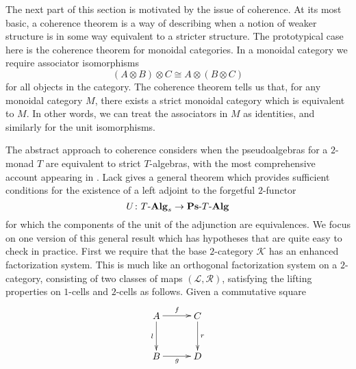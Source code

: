 The next part of this section is motivated by the issue of coherence. At its most basic, a coherence theorem is a way of describing when a notion of weaker structure is in some way equivalent to a stricter structure. The prototypical case here is the coherence theorem for monoidal categories. In a monoidal category we require associator isomorphisms
    \[
        \left( A \otimes B \right) \otimes C \cong A \otimes \left( B \otimes C \right)
    \]
for all objects in the category. The coherence theorem tells us that, for any monoidal category $M$, there exists a strict monoidal category which is equivalent to $M$. In other words, we can treat the associators in $M$ as identities, and similarly for the unit isomorphisms.

The abstract approach to coherence considers when the pseudoalgebras for a $2$-monad $T$ are equivalent to strict $T$-algebras, with the most comprehensive account appearing in \cite{lack-cod}. Lack gives a general theorem which provides sufficient conditions for the existence of a left adjoint to the forgetful $2$-functor
    \[
        U \colon T\mbox{-}\mathbf{Alg}_s \rightarrow \mathbf{Ps}\mbox{-}T\mbox{-}\mathbf{Alg}
    \]
for which the components of the unit of the adjunction are equivalences. We focus on one version of this general result which has hypotheses that are quite easy to check in practice. First we require that the base $2$-category $\mathcal{K}$ has an enhanced factorization system. This is much like an orthogonal factorization system on a $2$-category, consisting of two classes of maps $(\mathcal{L},\mathcal{R})$, satisfying the lifting properties on $1$-cells and $2$-cells as follows. Given a commutative square
     \[
        \xy
            (0,0)*+{A}="00";
            (15,0)*+{C}="10";
            (0,-15)*+{B}="01";
            (15,-15)*+{D}="11";
            {\ar^{f} "00" ; "10"};
            {\ar^{r} "10" ; "11"};
            {\ar_{l} "00" ; "01"};
            {\ar_{g} "01" ; "11"};
        \endxy
     \]

